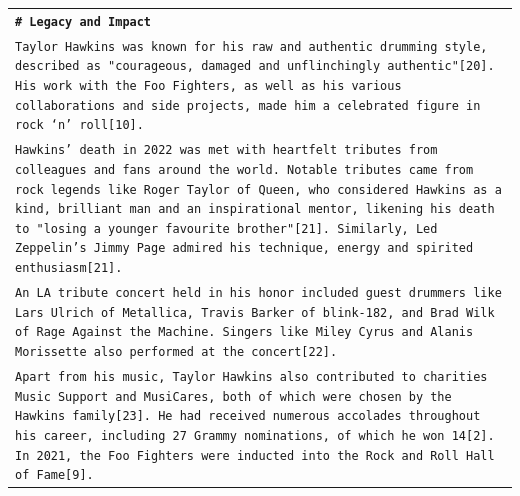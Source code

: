 \begin{longtable}{p{\textwidth}}
\vspace{1pt}
\texttt{\small{\textbf{\# Legacy and Impact}}} \\
\texttt{\small{Taylor Hawkins was known for his raw and authentic drumming style, described as "courageous, damaged and unflinchingly authentic"[20]. His work with the Foo Fighters, as well as his various collaborations and side projects, made him a celebrated figure in rock ‘n’ roll[10].}} \\
\texttt{\small{Hawkins' death in 2022 was met with heartfelt tributes from colleagues and fans around the world. Notable tributes came from rock legends like Roger Taylor of Queen, who considered Hawkins as a kind, brilliant man and an inspirational mentor, likening his death to "losing a younger favourite brother"[21]. Similarly, Led Zeppelin’s Jimmy Page admired his technique, energy and spirited enthusiasm[21].}} \\
\texttt{\small{An LA tribute concert held in his honor included guest drummers like Lars Ulrich of Metallica, Travis Barker of blink-182, and Brad Wilk of Rage Against the Machine. Singers like Miley Cyrus and Alanis Morissette also performed at the concert[22].}} \\
\texttt{\small{Apart from his music, Taylor Hawkins also contributed to charities Music Support and MusiCares, both of which were chosen by the Hawkins family[23]. He had received numerous accolades throughout his career, including 27 Grammy nominations, of which he won 14[2]. In 2021, the Foo Fighters were inducted into the Rock and Roll Hall of Fame[9].}} \\


\end{longtable}
